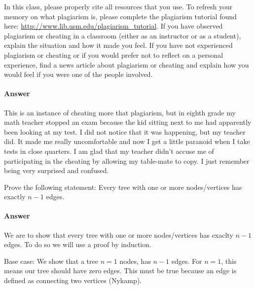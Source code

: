 \documentclass{article}
\begin{document}
\nextprob
\collab{}

    In this class,
    please properly cite all resources that you use.
    To refresh your memory on what plagiarism is,
    please
    complete the plagiarism tutorial found here:
    \url{http://www.lib.usm.edu/plagiarism_tutorial}.
    If you have observed plagiarism or cheating in a classroom (either as an
    instructor or as a student), explain the situation and how it made you
    feel.  If you have not experienced plagiarism or cheating or if you would
    prefer not to reflect on a personal experience, find a news
    article about plagiarism or cheating and explain how you would feel if you
    were one of the people involved.


\paragraph{Answer}


This is an instance of cheating more that plagiarism, but in eighth grade my math teacher stopped an exam because the kid sitting next to me 
had apparently been looking at my test. I did not notice that it was happening, but my teacher did. It made me really uncomfortable and now I get a 
little paranoid when I take tests in close quarters. I am glad that my teacher didn't accuse me of participating in the cheating by allowing my table-mate to copy. 
I just remember being very surprised and confused. 





\nextprob
Prove the following statement: Every tree with one or more nodes/vertices has
exactly $n-1$ edges.

\paragraph{Answer}


We are to show that every tree with one or more nodes/vertices has exaclty $n-1$ edges. To do so we will use a 
proof by induction. 

Base case: We show that a tree $n = 1$ nodes, has $n - 1$ edges. For $n = 1$, this means our tree should have 
zero edges. This must be true because an edge is defined as connecting two vertices (Nykamp). 
\end{document}
